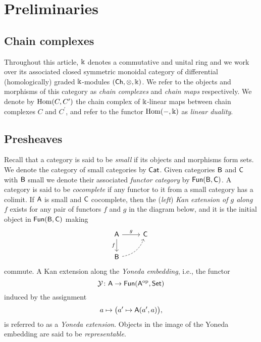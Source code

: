 
\section{Preliminaries}\label{s:preliminaries}

\subsection{Chain complexes}

Throughout this article, $\Bbbk$ denotes a commutative and unital ring and we work over its associated closed symmetric monoidal category of differential (homologically) graded $\Bbbk$-modules $(\mathsf{Ch}, \otimes, \Bbbk)$.
We refer to the objects and morphisms of this category as \textit{chain complexes} and \textit{chain maps} respectively.
We denote by $\mathrm{Hom}(C, C^\prime)$ the chain complex of $\Bbbk$-linear maps between chain complexes $C$ and $C^\prime$, and refer to the functor $\mathrm{Hom}(-, \Bbbk)$ as \textit{linear duality}.

\subsection{Presheaves}

Recall that a category is said to be \textit{small} if its objects and morphisms form sets.
We denote the category of small categories by $\mathsf{Cat}$.
Given categories $\mathsf{B}$ and $\mathsf{C}$ with $\mathsf{B}$ small we denote their associated \textit{functor category} by $\mathsf{Fun}(\mathsf{B}, \mathsf{C})$.
A category is said to be \textit{cocomplete} if any functor to it from a small category has a colimit.
If $\mathsf{A}$ is small and $\mathsf{C}$ cocomplete, then the (\textit{left}) \textit{Kan extension of $g$ along $f$} exists for any pair of functors $f$ and $g$ in the diagram below, and it is the initial object in $\mathsf{Fun}(\mathsf{B}, \mathsf{C})$ making
\begin{equation*}
\begin{tikzcd}[column sep=normal, row sep=normal]
\sA \arrow[d, "f"'] \arrow[r, "g"] & \sC \\
\sB \arrow[dashed, ur, bend right] & \quad
\end{tikzcd}
\end{equation*}
commute.
A Kan extension along the \textit{Yoneda embedding}, i.e., the functor
\[
\operatorname{\mathcal{Y}} \colon \mathsf{A} \to \mathsf{Fun}(\mathsf{A}^{\mathrm{op}}, \mathsf{Set})
\]
induced by the assignment
\[
a \mapsto \big( a^\prime \mapsto \mathsf{A}(a^\prime, a) \big),
\]
is referred to as a \textit{Yoneda extension}.
Objects in the image of the Yoneda embedding are said to be \textit{representable}.

